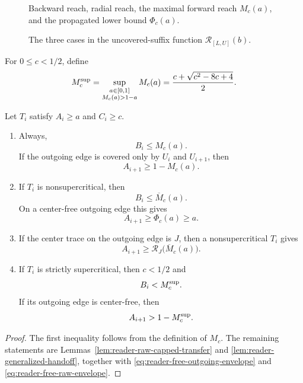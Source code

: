 \begin{figure}[H]
\centering
\resizebox{.92\linewidth}{!}{}
\caption{Backward reach, radial reach, the maximal forward reach $M_c(a)$,
and the propagated lower bound $\Phi_c(a)$.}
\label{fig:transfer-vtriangle-skeleton}
\end{figure}

\begin{figure}[H]
\centering
\resizebox{.99\linewidth}{!}{}
\caption{The three cases in the uncovered-suffix function
$\mathcal R_{[L,U]}(b)$.}
\label{fig:transfer-residual-skeleton}
\end{figure}

\begin{definition}
\label{def:body-supercritical-envelope}
For $0\le c<1/2$, define
\[
 M_c^{\rm sup}
 =\sup_{\substack{a\in[0,1]\\M_c(a)>1-a}}M_c(a)
 =\frac{c+\sqrt{c^2-8c+4}}2.
\]
\end{definition}

\begin{proposition}
\label{prop:body-transfer-interface}
Let $T_i$ satisfy $A_i\ge a$ and $C_i\ge c$.
\begin{enumerate}
\item Always,
\[
 B_i\le M_c(a).
\]
If the outgoing edge is covered only by $U_i$ and $U_{i+1}$, then
\[
 A_{i+1}\ge1-M_c(a).
\]
\item If $T_i$ is nonsupercritical, then
\[
 B_i\le\overline M_c(a).
\]
On a center-free outgoing edge this gives
\[
 A_{i+1}\ge\Phi_c(a)\ge a.
\]
\item If the center trace on the outgoing edge is $J$, then a
nonsupercritical $T_i$ gives
\[
 A_{i+1}\ge\mathcal R_J\bigl(\overline M_c(a)\bigr).
\]
\item If $T_i$ is strictly supercritical, then $c<1/2$ and
\[
 B_i<M_c^{\rm sup}.
\]
If its outgoing edge is center-free, then
\[
 A_{i+1}>1-M_c^{\rm sup}.
\]
\end{enumerate}
\end{proposition}

\begin{proof}
The first inequality follows from the definition of $M_c$.  The remaining
statements are Lemmas~\ref{lem:reader-raw-capped-transfer} and
\ref{lem:reader-generalized-handoff}, together with
\eqref{eq:reader-free-outgoing-envelope} and
\eqref{eq:reader-free-raw-envelope}.
\end{proof}

